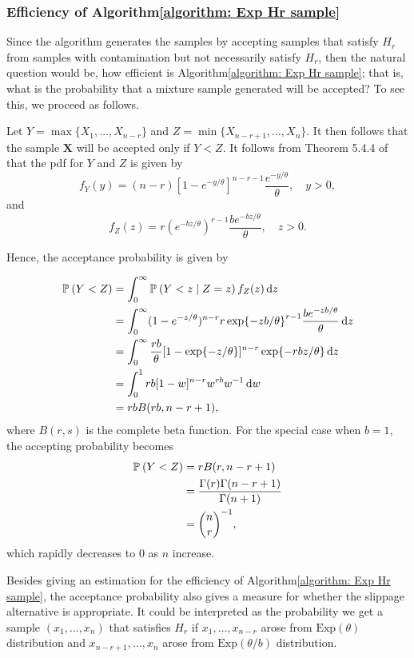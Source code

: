 \documentclass{report}
\begin{document}
\subsubsection{Efficiency of Algorithm\ref{algorithm: Exp Hr sample}}

Since the algorithm generates the samples by accepting samples that satisfy $H_r$
from samples with contamination but not necessarily satisfy $H_r$, then the natural question would be, how efficient is
Algorithm\ref{algorithm: Exp Hr sample}; that is, what is the probability that a mixture sample generated will be
accepted? To see this, we proceed as follows.

Let $Y = \max\{X_1,\ldots,X_{n-r}\}$ and $Z = \min\{X_{n-r+1}, \ldots, X_{n}\}$. It then follows that the 
sample $\mathbf X$ will be accepted
only if $ Y < Z$. It follows from Theorem 5.4.4 of \cite{casella2002statistical} that the pdf for $Y$ and $Z$ is given by
\[ 
    f_Y(y) = (n-r)[1 - e^{-y/\theta}]^{n-r-1} \frac{e^{-y/\theta}}{\theta}, \quad y >0,
\]
and
\[ 
    f_Z(z) = r (e^{-bz/\theta})^{r-1} \frac{b e^{-bz/\theta}}{\theta}, \quad z > 0.
\]

Hence, the acceptance probability is given by

\begin{align*}    
    \P{Y < Z} &= \int_0^\infty \P{Y < z \mid Z = z} f_Z(z) \dd{z}
    \\
    &= \int_0^\infty (1- e^{-z/\theta})^{n-r} r \exp{-zb/\theta}^{r-1} \frac{be^{-zb/\theta}}{\theta} \dd{z}
    \\
    &= \int_0^\infty \frac{rb}{\theta}[1-\exp{-z/\theta}]^{n-r} \exp{-rbz/\theta} \dd{z}
    \\
    &= \int_0^1 rb [1-w]^{n-r} w^{rb} w^{-1} \dd{w}
    \\
    &= rb B(rb, n-r+1),
\end{align*}
where $B(r,s)$ is the complete beta function. For the special case when $b =1$, the accepting probability becomes
\begin{align*}
    \P{Y <Z} &= r B(r, n-r+1)
    \\
    &= \frac{\Gamma(r)\Gamma(n-r+1)}{\Gamma(n+1)}
    \\
    &= \binom{n}{r}^{-1},
\end{align*}
which rapidly decreases to $0$ as $n$ increase.

Besides giving an estimation for the efficiency of Algorithm\ref{algorithm: Exp Hr sample},
the acceptance probability also gives a measure for whether the slippage alternative is appropriate. It could be interpreted as the probability
we get a sample $(x_1,\ldots, x_n)$ that satisfies $H_r$ if $x_1,\ldots,x_{n-r}$ arose from $\mathrm{Exp}(\theta)$ distribution and
$x_{n-r+1},\ldots,x_{n}$ arose from $\mathrm{Exp}(\theta /b)$ distribution. 
\end{document}
